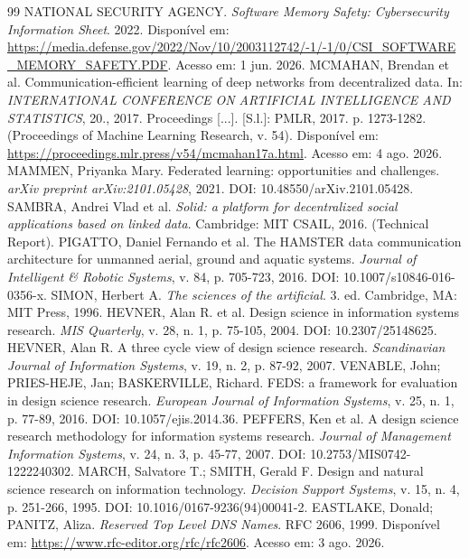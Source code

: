 \documentclass[12pt,openright,twoside,a4paper,english,brazil]{abntex2}
\begin{document}
\begin{thebibliography}{99}
 NATIONAL SECURITY AGENCY. \textit{Software Memory Safety: Cybersecurity Information Sheet}. 2022. Disponível em: \url{https://media.defense.gov/2022/Nov/10/2003112742/-1/-1/0/CSI_SOFTWARE_MEMORY_SAFETY.PDF}. Acesso em: 1 jun. 2026.
 MCMAHAN, Brendan et al. Communication-efficient learning of deep networks from decentralized data. In: \textit{INTERNATIONAL CONFERENCE ON ARTIFICIAL INTELLIGENCE AND STATISTICS}, 20., 2017. Proceedings [...]. [S.l.]: PMLR, 2017. p. 1273-1282. (Proceedings of Machine Learning Research, v. 54). Disponível em: \url{https://proceedings.mlr.press/v54/mcmahan17a.html}. Acesso em: 4 ago. 2026.
 MAMMEN, Priyanka Mary. Federated learning: opportunities and challenges. \textit{arXiv preprint arXiv:2101.05428}, 2021. DOI: 10.48550/arXiv.2101.05428.
 SAMBRA, Andrei Vlad et al. \textit{Solid: a platform for decentralized social applications based on linked data}. Cambridge: MIT CSAIL, 2016. (Technical Report).
 PIGATTO, Daniel Fernando et al. The HAMSTER data communication architecture for unmanned aerial, ground and aquatic systems. \textit{Journal of Intelligent \& Robotic Systems}, v. 84, p. 705-723, 2016. DOI: 10.1007/s10846-016-0356-x.
 SIMON, Herbert A. \textit{The sciences of the artificial}. 3. ed. Cambridge, MA: MIT Press, 1996.
 HEVNER, Alan R. et al. Design science in information systems research. \textit{MIS Quarterly}, v. 28, n. 1, p. 75-105, 2004. DOI: 10.2307/25148625.
 HEVNER, Alan R. A three cycle view of design science research. \textit{Scandinavian Journal of Information Systems}, v. 19, n. 2, p. 87-92, 2007.
 VENABLE, John; PRIES-HEJE, Jan; BASKERVILLE, Richard. FEDS: a framework for evaluation in design science research. \textit{European Journal of Information Systems}, v. 25, n. 1, p. 77-89, 2016. DOI: 10.1057/ejis.2014.36.
 PEFFERS, Ken et al. A design science research methodology for information systems research. \textit{Journal of Management Information Systems}, v. 24, n. 3, p. 45-77, 2007. DOI: 10.2753/MIS0742-1222240302.
 MARCH, Salvatore T.; SMITH, Gerald F. Design and natural science research on information technology. \textit{Decision Support Systems}, v. 15, n. 4, p. 251-266, 1995. DOI: 10.1016/0167-9236(94)00041-2.
 EASTLAKE, Donald; PANITZ, Aliza. \textit{Reserved Top Level DNS Names}. RFC 2606, 1999. Disponível em: \url{https://www.rfc-editor.org/rfc/rfc2606}. Acesso em: 3 ago. 2026.

\end{thebibliography}
\end{document}
